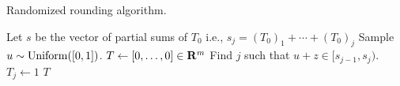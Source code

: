 \begin{algorithm}[h!]
\caption{Randomized rounding algorithm.}
\label{alg:round}
\begin{algorithmic}[1]
\State Let $s$ be the vector of partial sums of $T_0$ \Comment i.e., $s_j = (T_0)_1 + \cdots + (T_0)_j$
\State Sample $u \sim \operatorname{Uniform}([0,1])$.
\State $T \gets [0,\ldots,0] \in \mathbf{R}^m$
\State Find $j$ such that $u+z \in [s_{j-1},s_j)$. 
\State $T_j \gets 1$
\EndFor
\State \Return $T$
\EndProcedure
\end{algorithmic}
\end{algorithm}
